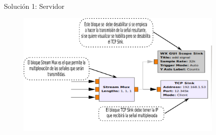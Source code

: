 \begin{frame}{Solución 1: Servidor }
\begin{figure}[H]
	\vspace{-3mm}
	\centering
	\includegraphics[width=0.9\textwidth]{soluciones/actividad-1-1/pdf/Actividad1_2.pdf}
\end{figure}
\end{frame}

